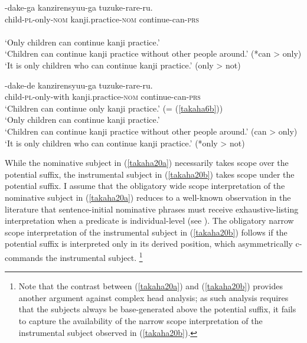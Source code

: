 \documentclass[output=paper]{langscibook}
\begin{document}
\begin{exe}
\ex \label{takaha20}
\begin{xlist}
\ex \label{takaha20a}
	-{dake-ga} {kanzirensyuu-ga} {tuzuke-rare-ru.}\\
	child-\textsc{pl}-only-\textsc{nom}  kanji.practice-\textsc{nom} continue-can-\textsc{prs}\\\\
	\glt `Only children can continue kanji practice.’\\ 
	`Children can continue kanji practice without other people around.’ (*can \textgreater{} only)\\
	‘It is only children who can continue kanji practice.’ (only \textgreater{} not)
	
\ex \label{takaha20b}
	-{dake-de} {kanzirensyuu-ga} {tuzuke-rare-ru.}\\
	child-\textsc{pl}-only-with       kanji.practice-\textsc{nom} continue-can-\textsc{prs}\\
	\glt ‘Children can continue only kanji practice.’ (= (\ref{takaha6b})) \\
	`Only children can continue kanji practice.’\\ 
	`Children can continue kanji practice without other people around.’ (can \textgreater{} only)\\
	‘It is only children who can continue kanji practice.’ (*only \textgreater{} not)
\end{xlist}
\end{exe}

While the nominative subject in (\ref{takaha20a}) necessarily takes scope over the potential suffix, the instrumental subject in (\ref{takaha20b}) takes scope under the potential suffix. I assume that the obligatory wide scope interpretation of the nominative subject in (\ref{takaha20a}) reduces to a well-known observation in the literature that sentence-initial nominative phrases must receive exhaustive-listing interpretation when a predicate is individual-level (see \citealt{kuno1973}). The obligatory narrow scope interpretation of the instrumental subject in (\ref{takaha20b}) follows if the potential suffix is interpreted only in its derived position, which asymmetrically c-commands the instrumental subject. \footnote{Note that the contrast between (\ref{takaha20a}) and (\ref{takaha20b}) provides another argument against complex head analysis; as such analysis requires that the subjects always be base-generated above the potential suffix, it fails to capture the availability of the narrow scope interpretation of the instrumental subject observed in (\ref{takaha20b}).}
\end{document}
